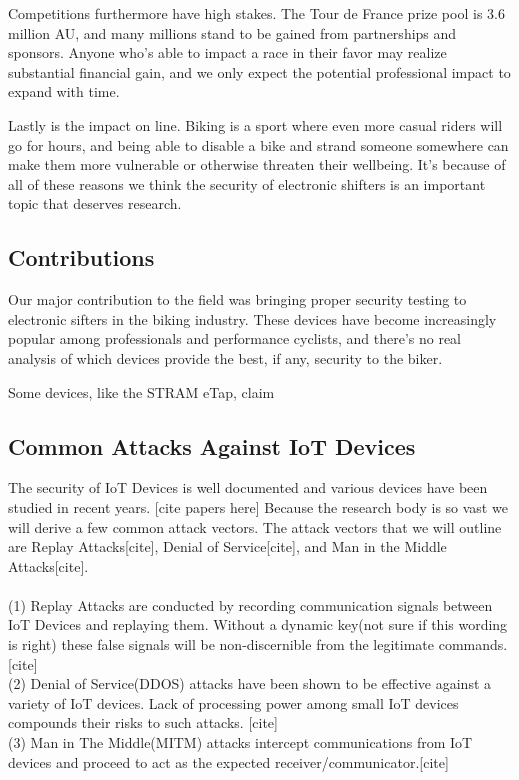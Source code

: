 \documentclass[letterpaper,twocolumn,10pt]{article}
\begin{document}
Competitions furthermore have high stakes. The Tour de France prize pool is 3.6 million AU, and many millions stand to be gained from partnerships and sponsors. Anyone who's able to impact a race in their favor may realize substantial financial gain, and we only expect the potential professional impact to expand with time.

Lastly is the impact on line. Biking is a sport where even more casual riders will go for hours, and being able to disable a bike and strand someone somewhere can make them more vulnerable or otherwise threaten their wellbeing. It's because of all of these reasons we think the security of electronic shifters is an important topic that deserves research.

\subsection{Contributions}

Our major contribution to the field was bringing proper security testing to electronic sifters in the biking industry. These devices have become increasingly popular among professionals and performance cyclists, and there's no real analysis of which devices provide the best, if any, security to the biker.

Some devices, like the STRAM eTap, claim

\subsection{Common Attacks Against IoT Devices}

The security of IoT Devices is well documented and various devices have been studied in recent years. [cite papers here] Because the research body is so vast we will derive a few common attack vectors. The attack vectors that we will outline are Replay Attacks[cite], Denial of Service[cite], and Man in the Middle Attacks[cite].
\\\\
(1) Replay Attacks are conducted by recording communication signals between IoT Devices and replaying them. Without a dynamic key(not sure if this wording is right) these false signals will be non-discernible from the legitimate commands. [cite] \\
(2) Denial of Service(DDOS) attacks have been shown to be effective against a variety of IoT devices. Lack of processing power among small IoT devices compounds their risks to such attacks. [cite] \\
(3) Man in The Middle(MITM) attacks intercept communications from IoT devices and proceed to act as the expected receiver/communicator.[cite]\\
\end{document}
